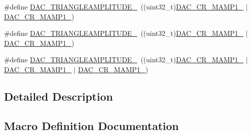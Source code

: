 \begin{DoxyCompactItemize}
\item 
\#define \mbox{\hyperlink{group___d_a_c_ex__lfsrunmask__triangleamplitude_ga0302e3294e47d56bd8ccf3c1f9666b67}{D\+A\+C\+\_\+\+T\+R\+I\+A\+N\+G\+L\+E\+A\+M\+P\+L\+I\+T\+U\+D\+E\+\_}}~((uint32\+\_\+t)\mbox{\hyperlink{group___peripheral___registers___bits___definition_gafdc83b4feb742c632ba66f55d102432b}{D\+A\+C\+\_\+\+C\+R\+\_\+\+M\+A\+M\+P1\+\_}} $\vert$ \mbox{\hyperlink{group___peripheral___registers___bits___definition_ga4225dcce22b440fcd3a8ad96c5f2baec}{D\+A\+C\+\_\+\+C\+R\+\_\+\+M\+A\+M\+P1\+\_}})
\item 
\#define \mbox{\hyperlink{group___d_a_c_ex__lfsrunmask__triangleamplitude_ga23eb0e66c25fb8ba56b4a6fe8cc2686a}{D\+A\+C\+\_\+\+T\+R\+I\+A\+N\+G\+L\+E\+A\+M\+P\+L\+I\+T\+U\+D\+E\+\_}}~((uint32\+\_\+t)\mbox{\hyperlink{group___peripheral___registers___bits___definition_gafdc83b4feb742c632ba66f55d102432b}{D\+A\+C\+\_\+\+C\+R\+\_\+\+M\+A\+M\+P1\+\_}} $\vert$ \mbox{\hyperlink{group___peripheral___registers___bits___definition_ga6cc15817842cb7992d449c448684f68d}{D\+A\+C\+\_\+\+C\+R\+\_\+\+M\+A\+M\+P1\+\_}})
\item 
\#define \mbox{\hyperlink{group___d_a_c_ex__lfsrunmask__triangleamplitude_ga5dfccaa15e2e0df626aa6bd649b9fb20}{D\+A\+C\+\_\+\+T\+R\+I\+A\+N\+G\+L\+E\+A\+M\+P\+L\+I\+T\+U\+D\+E\+\_}}~((uint32\+\_\+t)\mbox{\hyperlink{group___peripheral___registers___bits___definition_gafdc83b4feb742c632ba66f55d102432b}{D\+A\+C\+\_\+\+C\+R\+\_\+\+M\+A\+M\+P1\+\_}} $\vert$ \mbox{\hyperlink{group___peripheral___registers___bits___definition_ga6cc15817842cb7992d449c448684f68d}{D\+A\+C\+\_\+\+C\+R\+\_\+\+M\+A\+M\+P1\+\_}} $\vert$ \mbox{\hyperlink{group___peripheral___registers___bits___definition_ga4225dcce22b440fcd3a8ad96c5f2baec}{D\+A\+C\+\_\+\+C\+R\+\_\+\+M\+A\+M\+P1\+\_}})
\end{DoxyCompactItemize}


\subsection{Detailed Description}


\subsection{Macro Definition Documentation}
\mbox{\label{group___d_a_c_ex__lfsrunmask__triangleamplitude_ga7a003ed3e05458a7d00a06c1ef16865b}} 
